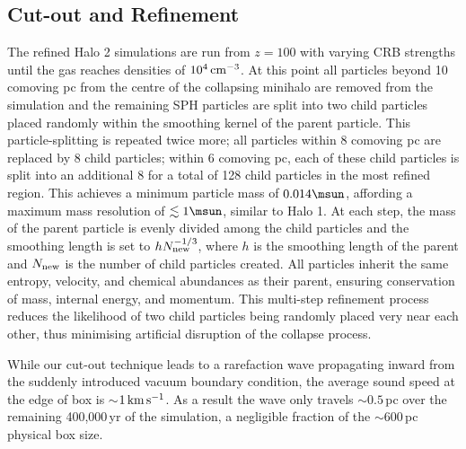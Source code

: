 \subsection{Cut-out and Refinement}
\label{cutout}

The refined Halo 2 simulations are run from $z=100$ with varying CRB strengths until the gas reaches densities of $10^4\,{\rm cm}^{-3}$.  At this point all particles beyond 10 comoving pc from the centre of the collapsing minihalo are removed from the simulation and the remaining SPH particles are split into two child particles placed randomly within the smoothing kernel of the parent particle.  This particle-splitting is repeated twice more; all particles within 8 comoving pc are replaced by 8 child particles; within 6 comoving pc, each of these child particles is split into an additional 8 for a total of 128 child particles in the most refined region.  This achieves a minimum particle mass of $0.014\msun$, affording a maximum mass resolution of $\lesssim 1\msun$, similar to Halo 1.  At each step, the mass of the parent particle is evenly divided among the child particles and the smoothing length is set to $h N_{\rm new}^{-1/3}$, where $h$ is the smoothing length of the parent and $N_{\rm new}$ is the number of child particles created.  All particles inherit the same entropy, velocity, and chemical abundances as their parent, ensuring conservation of mass, internal energy, and momentum.  This multi-step refinement process reduces the likelihood of two child particles being randomly placed very near each other, thus minimising artificial disruption of the collapse process.

While our cut-out technique leads to a rarefaction wave propagating inward from the suddenly introduced vacuum boundary condition, the average sound speed at the edge of box is $\sim$$1\,{\rm km}\,{\rm s}^{-1}$.  As a result the wave only travels $\sim$$0.5\,$pc over the remaining 400,000$\,$yr of the simulation, a negligible fraction of the $\sim$600$\,$pc physical box size.
